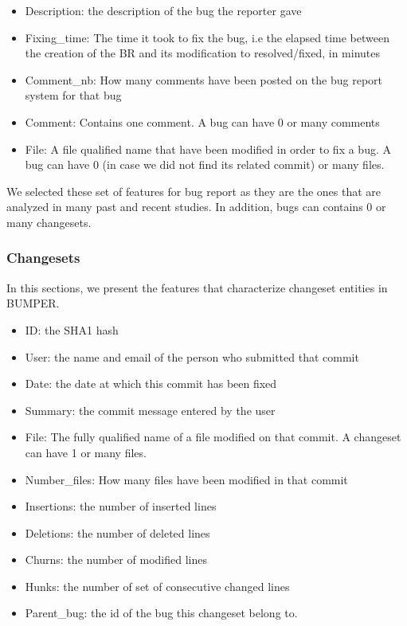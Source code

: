 \begin{itemize}
\item Description: the description of the bug the reporter gave
\item Fixing\_time: The time it took to fix the bug, i.e the elapsed time between the creation of the BR and its modification to resolved/fixed, in minutes
\item Comment\_nb: How many comments have been posted on the bug report system for that bug
\item Comment: Contains one comment. A bug can have 0 or many comments
\item File: A file qualified name that have been modified in order to fix a bug. A bug can have 0 (in case we did not find its related commit) or many files.

\end{itemize}

We selected these set of features for bug report as they are the ones that are analyzed in many past and recent studies. In addition, bugs can contains 0 or many changesets.

\subsubsection{Changesets}

In this sections, we present the features that characterize changeset entities in BUMPER.

\begin{itemize}

\item ID: the SHA1 hash
\item User: the name and email of the person who submitted that commit
\item Date: the date at which this commit has been fixed
\item Summary: the commit message entered by the user
\item File: The fully qualified name of a file modified on that commit. A changeset can have 1 or many files.
\item Number\_files: How many files have been modified in that commit
\item Insertions: the number of inserted lines
\item Deletions: the number of deleted lines
\item Churns: the number of modified lines
\item Hunks: the number of set of consecutive changed lines
\item Parent\_bug: the id of the bug this changeset belong to.

\end{itemize}


